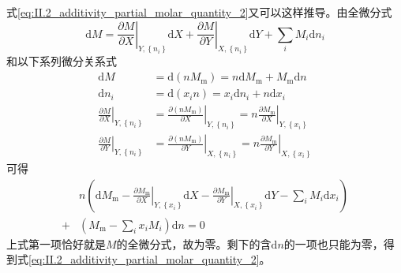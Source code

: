 \documentclass[main.tex]{subfiles}
\begin{document}
式\eqref{eq:II.2_additivity_partial_molar_quantity_2}又可以这样推导。由全微分式
\[\mathrm{d}M=\left.\frac{\partial M}{\partial X}\right|_{Y,\left\{n_i\right\}}\mathrm{d}X+\left.\frac{\partial M}{\partial Y}\right|_{X,\left\{n_i\right\}}\mathrm{d}Y+\sum_i M_i\mathrm{d}n_i\]
和以下系列微分关系式
\begin{align*}
    \mathrm{d}M                                                       & =\mathrm{d}\left(nM_\text{m}\right)=n\mathrm{d}M_\text{m}+M_\text{m}\mathrm{d}n                                                                                       \\
    \mathrm{d}n_i                                                     & =\mathrm{d}\left(x_i n\right)=x_i\mathrm{d}n_i+n\mathrm{d}x_i                                                                                                         \\
    \left.\frac{\partial M}{\partial X}\right|_{Y,\left\{n_i\right\}} & =\left.\frac{\partial \left(nM_\text{m}\right)}{\partial X}\right|_{Y,\left\{n_i\right\}}=n\left.\frac{\partial M_\text{m}}{\partial X}\right|_{Y,\left\{x_i\right\}} \\
    \left.\frac{\partial M}{\partial Y}\right|_{Y,\left\{n_i\right\}} & =\left.\frac{\partial\left(nM_\text{m}\right)}{\partial Y}\right|_{X,\left\{n_i\right\}}=n\left.\frac{\partial M_\text{m}}{\partial Y}\right|_{X,\left\{x_i\right\}}
\end{align*}
可得
\begin{align*}
      & n\left(\mathrm{d}M_\text{m}-\left.\frac{\partial M_\text{m}}{\partial X}\right|_{Y,\left\{x_i\right\}}\mathrm{d}X-\left.\frac{\partial M_\text{m}}{\partial Y}\right|_{X,\left\{x_i\right\}}\mathrm{d}Y-\sum_iM_i\mathrm{d}x_i\right) \\
    + & \left(M_\text{m}-\sum_ix_iM_i\right)\mathrm{d}n=0
\end{align*}
上式第一项恰好就是$M$的全微分式，故为零。剩下的含$\mathrm{d}n$的一项也只能为零，得到式\eqref{eq:II.2_additivity_partial_molar_quantity_2}。
\end{document}
